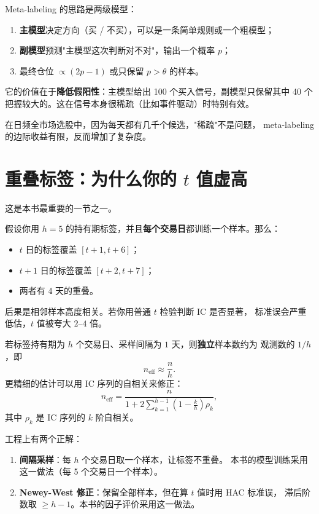 Meta-labeling 的思路是两级模型：

\begin{enumerate}
  \item \textbf{主模型}决定方向（买 / 不买），可以是一条简单规则或一个粗模型；
  \item \textbf{副模型}预测"主模型这次判断对不对"，输出一个概率 $p$；
  \item 最终仓位 $\propto (2p - 1)$ 或只保留 $p > \theta$ 的样本。
\end{enumerate}

它的价值在于\textbf{降低假阳性}：主模型给出 100 个买入信号，副模型只保留其中 40 个
把握较大的。这在信号本身很稀疏（比如事件驱动）时特别有效。

在日频全市场选股中，因为每天都有几千个候选，"稀疏"不是问题，
meta-labeling 的边际收益有限，反而增加了复杂度。

\section{重叠标签：为什么你的 $t$ 值虚高}

这是本书最重要的一节之一。

假设你用 $h=5$ 的持有期标签，并且\textbf{每个交易日}都训练一个样本。那么：
\begin{itemize}
  \item $t$ 日的标签覆盖 $[t+1, t+6]$；
  \item $t+1$ 日的标签覆盖 $[t+2, t+7]$；
  \item 两者有 4 天的重叠。
\end{itemize}

后果是相邻样本高度相关。若你用普通 $t$ 检验判断 IC 是否显著，
标准误会严重低估，$t$ 值被夸大 $2$--$4$ 倍。

\begin{proposition}[有效样本数]
若标签持有期为 $h$ 个交易日、采样间隔为 $1$ 天，则\textbf{独立}样本数约为
观测数的 $1/h$，即
\begin{equation}
  n_{\text{eff}} \approx \frac{n}{h}.
\end{equation}
更精细的估计可以用 IC 序列的自相关来修正：
\begin{equation}
  n_{\text{eff}} = \frac{n}{1 + 2\sum_{k=1}^{h-1}\left(1-\frac{k}{h}\right)\rho_k},
\end{equation}
其中 $\rho_k$ 是 IC 序列的 $k$ 阶自相关。
\end{proposition}

工程上有两个正解：

\begin{enumerate}
  \item \textbf{间隔采样}：每 $h$ 个交易日取一个样本，让标签不重叠。
        本书的模型训练采用这一做法（每 5 个交易日一个样本）。
  \item \textbf{Newey-West 修正}：保留全部样本，但在算 $t$ 值时用 HAC 标准误，
        滞后阶数取 $\ge h-1$。本书的因子评价采用这一做法。
\end{enumerate}

